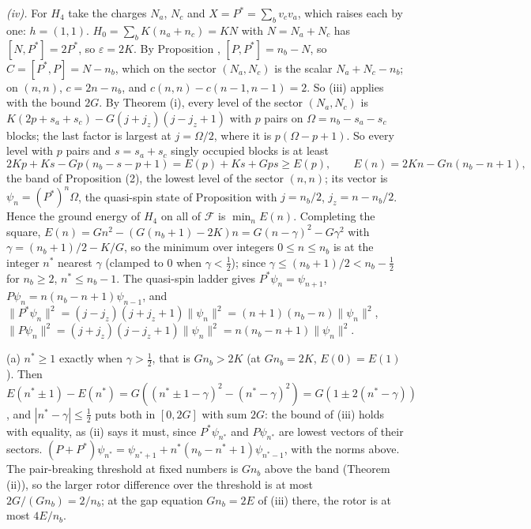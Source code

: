 \emph{(iv).} For $H_{4}$ take the charges $N_{a}$, $N_{c}$ and $X = P^{*} = \sum_{b}v_{c}v_{a}$, which raises each by one: $h = (1, 1)$. $H_{0} = \sum_{b}K(n_{a} + n_{c}) = KN$ with $N = N_{a} + N_{c}$ has $[N, P^{*}] = 2P^{*}$, so $\varepsilon = 2K$. By Proposition , $[P, P^{*}] = n_{b} - N$, so $C = [P^{*}, P] = N - n_{b}$, which on the sector $(N_{a}, N_{c})$ is the scalar $N_{a} + N_{c} - n_{b}$; on $(n, n)$, $c = 2n - n_{b}$, and $c(n, n) - c(n - 1, n - 1) = 2$. So (iii) applies with the bound $2G$. By Theorem (i), every level of the sector $(N_{a}, N_{c})$ is $K(2p + s_{a} + s_{c}) - G(j + j_{z})(j - j_{z} + 1)$ with $p$ pairs on $\Omega = n_{b} - s_{a} - s_{c}$ blocks; the last factor is largest at $j = \Omega/2$, where it is $p(\Omega - p + 1)$. So every level with $p$ pairs and $s = s_{a} + s_{c}$ singly occupied blocks is at least
\[
2Kp + Ks - Gp(n_{b} - s - p + 1) = E(p) + Ks + Gps \ge E(p), \qquad E(n) = 2Kn - Gn(n_{b} - n + 1),
\]
the band of Proposition (2), the lowest level of the sector $(n, n)$; its vector is $\psi_{n} = (P^{*})^{n}\Omega$, the quasi-spin state of Proposition  with $j = n_{b}/2$, $j_{z} = n - n_{b}/2$. Hence the ground energy of $H_{4}$ on all of $\mathcal{F}$ is $\min_{n}E(n)$. Completing the square, $E(n) = Gn^{2} - (G(n_{b} + 1) - 2K)n = G(n - \gamma)^{2} - G\gamma^{2}$ with $\gamma = (n_{b} + 1)/2 - K/G$, so the minimum over integers $0 \le n \le n_{b}$ is at the integer $n^{*}$ nearest $\gamma$ (clamped to $0$ when $\gamma < \tfrac12$); since $\gamma \le (n_{b} + 1)/2 < n_{b} - \tfrac12$ for $n_{b} \ge 2$, $n^{*} \le n_{b} - 1$. The quasi-spin ladder gives $P^{*}\psi_{n} = \psi_{n+1}$, $P\psi_{n} = n(n_{b} - n + 1)\psi_{n-1}$, and $\|P^{*}\psi_{n}\|^{2} = (j - j_{z})(j + j_{z} + 1)\|\psi_{n}\|^{2} = (n + 1)(n_{b} - n)\|\psi_{n}\|^{2}$, $\|P\psi_{n}\|^{2} = (j + j_{z})(j - j_{z} + 1)\|\psi_{n}\|^{2} = n(n_{b} - n + 1)\|\psi_{n}\|^{2}$.

(a) $n^{*} \ge 1$ exactly when $\gamma > \tfrac12$, that is $Gn_{b} > 2K$ (at $Gn_{b} = 2K$, $E(0) = E(1)$). Then $E(n^{*} \pm 1) - E(n^{*}) = G((n^{*} \pm 1 - \gamma)^{2} - (n^{*} - \gamma)^{2}) = G(1 \pm 2(n^{*} - \gamma))$, and $|n^{*} - \gamma| \le \tfrac12$ puts both in $[0, 2G]$ with sum $2G$: the bound of (iii) holds with equality, as (ii) says it must, since $P^{*}\psi_{n^{*}}$ and $P\psi_{n^{*}}$ are lowest vectors of their sectors. $(P + P^{*})\psi_{n^{*}} = \psi_{n^{*}+1} + n^{*}(n_{b} - n^{*} + 1)\psi_{n^{*}-1}$, with the norms above. The pair-breaking threshold at fixed numbers is $Gn_{b}$ above the band (Theorem (ii)), so the larger rotor difference over the threshold is at most $2G/(Gn_{b}) = 2/n_{b}$; at the gap equation $Gn_{b} = 2E$ of (iii) there, the rotor is at most $4E/n_{b}$.

